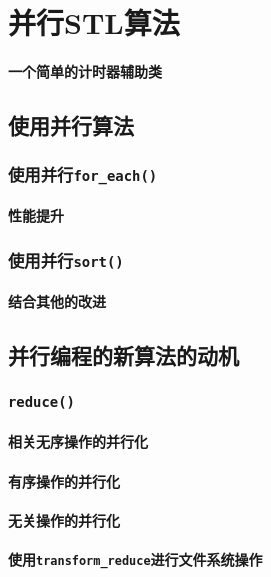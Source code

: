 \chapter{并行STL算法}\label{ch22}

\subsubsection{一个简单的计时器辅助类}

\section{使用并行算法}

\subsection{使用并行\texttt{for\_each()}}

\subsubsection{性能提升}

\subsection{使用并行\texttt{sort()}}

\subsubsection{结合其他的改进}\label{ch22.1.2.1}

\section{并行编程的新算法的动机}

\subsection{\texttt{reduce()}}
\subsubsection{相关无序操作的并行化}
\subsubsection{有序操作的并行化}
\subsubsection{无关操作的并行化}
\subsubsection{使用\texttt{transform\_reduce}进行文件系统操作}\label{ch22.6.1.4}
